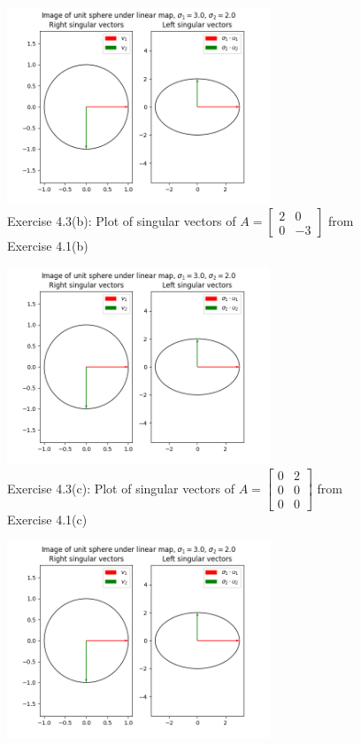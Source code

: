 \documentclass[12pt]{article}
\newenvironment{sol}[1][Solution]{\begin{trivlist}
		\item[\hskip \labelsep {\bfseries #1:}]}{\end{trivlist}}
\begin{document}
\begin{sol}
\begin{figure}
		\label{fig:4.3a}
	\end{figure}
	\begin{figure}
		\centering
		\includegraphics[width=0.7\textwidth]{a_plot_of_singular_vectors}
		\caption{Exercise 4.3(b): Plot of singular vectors of $A=\begin{bmatrix}
				2 & 0\\
				0 & -3
			\end{bmatrix}$ from Exercise 4.1(b)}
		\label{fig:4.3b}
	\end{figure}
	\begin{figure}
		\centering
		\includegraphics[width=0.7\textwidth]{a_plot_of_singular_vectors}
		\caption{Exercise 4.3(c): Plot of singular vectors of $A=\begin{bmatrix}
				0 & 2\\
				0 & 0\\
				0 & 0
			\end{bmatrix}$ from Exercise 4.1(c)}
		\label{fig:4.3c}
	\end{figure}
	\begin{figure}
		\centering
		\includegraphics[width=0.7\textwidth]{a_plot_of_singular_vectors}

\end{figure}
\end{sol}
\end{document}
